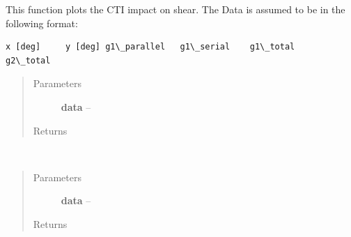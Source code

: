 \documentclass[a4paper,11pt,english]{sphinxmanual}
\begin{document}

\begin{fulllineitems}
\label{analysis:analysis.CTIpower.plotCTIeffect}
This function plots the CTI impact on shear. The Data is assumed to be in the following format:

\begin{Verbatim}[commandchars=\\\{\}]
x [deg]     y [deg] g1\_parallel   g1\_serial    g1\_total    g2\_total
\end{Verbatim}
\begin{quote}\begin{description}
\item[{Parameters}] \leavevmode
\textbf{data} -- 

\item[{Returns}] \leavevmode


\end{description}\end{quote}

\end{fulllineitems}


\begin{fulllineitems}
\label{analysis:analysis.CTIpower.plotPower}~\begin{quote}\begin{description}
\item[{Parameters}] \leavevmode
\textbf{data} -- 

\item[{Returns}] \leavevmode


\end{description}\end{quote}

\end{fulllineitems}

\end{document}
